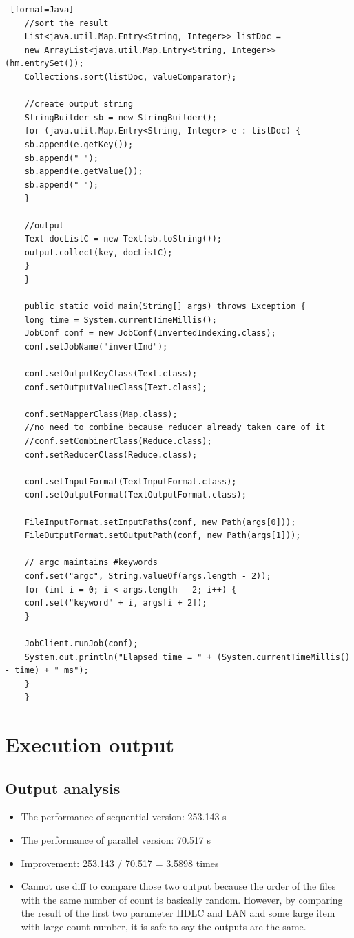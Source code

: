 \documentclass[11pt, letterpaper]{article}
\begin{document}
\begin{lstlisting} [format=Java]
	//sort the result
	List<java.util.Map.Entry<String, Integer>> listDoc =
	new ArrayList<java.util.Map.Entry<String, Integer>>(hm.entrySet());
	Collections.sort(listDoc, valueComparator);
	
	//create output string
	StringBuilder sb = new StringBuilder();
	for (java.util.Map.Entry<String, Integer> e : listDoc) {
	sb.append(e.getKey());
	sb.append(" ");
	sb.append(e.getValue());
	sb.append(" ");
	}
	
	//output
	Text docListC = new Text(sb.toString());
	output.collect(key, docListC);
	}
	}
	
	public static void main(String[] args) throws Exception {
	long time = System.currentTimeMillis();
	JobConf conf = new JobConf(InvertedIndexing.class);
	conf.setJobName("invertInd");
	
	conf.setOutputKeyClass(Text.class);
	conf.setOutputValueClass(Text.class);
	
	conf.setMapperClass(Map.class);
	//no need to combine because reducer already taken care of it
	//conf.setCombinerClass(Reduce.class);
	conf.setReducerClass(Reduce.class);
	
	conf.setInputFormat(TextInputFormat.class);
	conf.setOutputFormat(TextOutputFormat.class);
	
	FileInputFormat.setInputPaths(conf, new Path(args[0]));
	FileOutputFormat.setOutputPath(conf, new Path(args[1]));
	
	// argc maintains #keywords
	conf.set("argc", String.valueOf(args.length - 2)); 
	for (int i = 0; i < args.length - 2; i++) {
	conf.set("keyword" + i, args[i + 2]);
	}
	
	JobClient.runJob(conf);
	System.out.println("Elapsed time = " + (System.currentTimeMillis() - time) + " ms");
	}
	}
	\end{lstlisting}
	\pagebreak
	
	
	\section {Execution output}
	\subsection{Output analysis}
	\begin{itemize} 
		\item The performance of sequential version: 253.143 s
		\item The performance of parallel version: 70.517 s
		\item Improvement: 253.143 / 70.517 = 3.5898 times
		\item Cannot use diff to compare those two output because the order of the files with the same number of count is basically random. However, by comparing the result of the first two parameter HDLC and LAN and some large item with large count number, it is safe to say the outputs are the same.
	\end{itemize}
\end{document}
